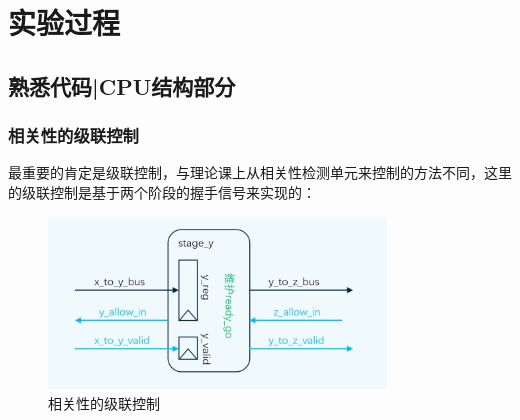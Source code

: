 \documentclass[a4paper]{article}
\begin{document}
\section{实验过程}

\subsection{熟悉代码|CPU结构部分}

\subsubsection{相关性的级联控制}

最重要的肯定是级联控制，与理论课上从相关性检测单元来控制的方法不同，这里的级联控制是基于两个阶段的握手信号来实现的：

\begin{figure}[H]
    \centering
    \includegraphics[width=0.8\textwidth]{img/复现流水线/级联控制.pdf}
    \caption{相关性的级联控制}
\end{figure}
\end{document}
